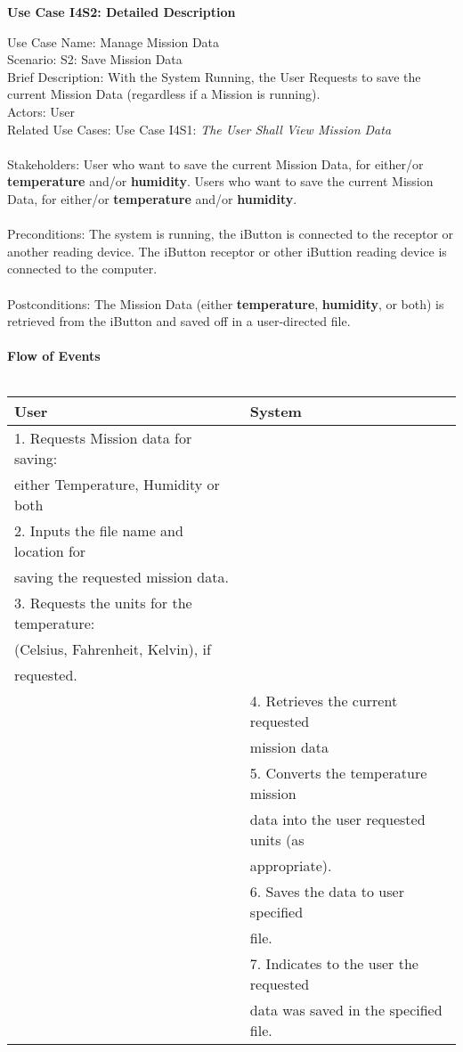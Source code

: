 \documentclass[letterpaper]{article}
\begin{document}
\noindent
\begin{center}
\textbf{Use Case I4S2:  Detailed Description}
\end{center}
Use Case Name:  Manage Mission Data\\
Scenario:  S2:  Save Mission Data\\
Brief Description:  With the System Running, the User Requests to
save the current Mission Data (regardless if a Mission is running).
\\
Actors:  User\\
Related Use Cases:  Use Case I4S1:  \textit{The User Shall View
Mission Data}\\\\
Stakeholders:  User who want to save the current Mission Data, for
either/or \textbf{temperature} and/or \textbf{humidity}.  Users who
want to save the current Mission Data, for either/or
\textbf{temperature} and/or \textbf{humidity}.\\\\
Preconditions:  The system is running, the iButton is connected to
the receptor or another reading device.  The iButton receptor or
other iButtion reading device is connected to the computer.\\\\
Postconditions:  The Mission Data (either \textbf{temperature},
\textbf{humidity}, or both) is retrieved from the iButton and
saved off in a user-directed file.\\\\
\textbf{Flow of Events}\\\\
\begin{tabular}{|l|l|}\hline
\textbf{User} & \textbf{System}\\\hline
1.  Requests Mission data for saving:       & \\
either Temperature, Humidity or both        & \\\hline
2.  Inputs the file name and location for   & \\
saving the requested mission data.          & \\\hline
3.  Requests the units for the temperature: & \\
(Celsius, Fahrenheit, Kelvin), if           & \\
requested.                                  & \\\hline
& 4.  Retrieves the current requested \\
& mission data \\\hline
& 5.  Converts the temperature mission \\
& data into the user requested units (as \\
& appropriate). \\\hline
& 6.  Saves the data to user specified \\
& file.\\\hline
& 7.  Indicates to the user the requested \\
& data was saved in the specified file.\\\hline
\end{tabular}\\\\
\end{document}

